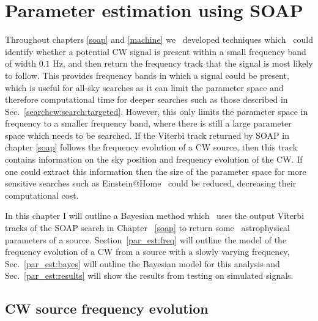 \chapter{\label{par_est}Parameter estimation using SOAP}

Throughout chapters \ref{soap} and \ref{machine} we~ developed
techniques which~ could identify whether a potential \gls{CW}
signal is present within a small frequency band of width $0.1$ Hz, and then
return the frequency track that the signal is most likely to follow.  This
provides frequency bands in which a signal could be present, which is useful
for all-sky searches as it can limit the parameter space and therefore
computational time for deeper searches such as those described in
Sec.~\ref{searchcw:search:targeted}.  However, this only limits the parameter
space in frequency to a smaller frequency band, where there is still a large
parameter space which needs to be searched.  If the Viterbi track returned by
SOAP in chapter \ref{soap} follows the frequency evolution of a \gls{CW}
source, then this track contains information on the sky position and frequency
evolution of the \gls{CW}.  If one could extract this information then the size
of the parameter space for more sensitive searches such as
Einstein@Home~ could be
reduced, decreasing their computational cost.~

In this chapter I will outline a Bayesian method which~ uses the output Viterbi tracks of the SOAP search in Chapter
~\ref{soap} to return some~ astrophysical parameters of a
source.  Section~\ref{par_est:freq} will outline the model of the frequency
evolution of a \gls{CW} from a source with a slowly varying frequency,
Sec.~\ref{par_est:bayes} will outline the Bayesian model for this analysis and
Sec.~\ref{par_est:results} will show the results from testing on simulated
signals.

\section{\label{par_est:freq}\gls{CW} source frequency evolution}

